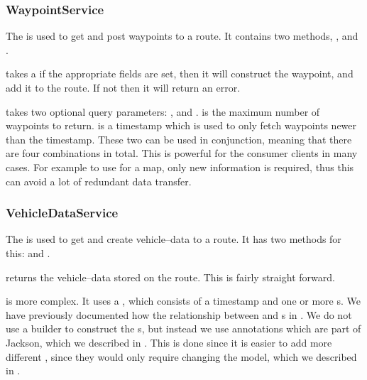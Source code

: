 \subsubsection*{WaypointService}
The  is used to get and post waypoints to a route.
It contains two methods, , and .

 takes a  if the appropriate fields are set, then it will construct the waypoint, and add it to the route.
If not then it will return an error.

 takes two optional query parameters: , and .
 is the maximum number of waypoints to return.
 is a timestamp which is used to only fetch waypoints newer than the timestamp.
These two can be used in conjunction, meaning that there are four combinations in total.
This is powerful for the consumer clients in many cases.
For example to use for a map, only new information is required, thus this can avoid a lot of redundant data transfer.

\subsubsection*{VehicleDataService}
The  is used to get and create vehicle--data to a route.
It has two methods for this:  and .

 returns the vehicle--data stored on the route.
This is fairly straight forward. 

 is more complex.
It uses a , which consists of a timestamp and one or more s.
We have previously documented how the relationship between  and s in .
We do not use a builder to construct the s, but instead we use annotations which are part of Jackson, which we described in .
This is done since it is easier to add more different , since they would only require changing the model, which we described in .
